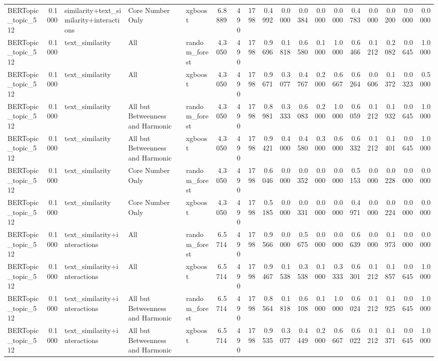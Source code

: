 \begin{tabular}{lrlllrrrrrrrrrrrrr}
BERTopic_topic_512 & 0.1000 & similarity+text_similarity+interactions & Core Number Only & xgboost & 6.8889 & 490 & 1798 & 0.4992 & 0.0000 & 0.0384 & 0.0000 & 0.0000 & 0.4783 & 0.0000 & 0.0200 & 0.0000 & 0.0000 \\
BERTopic_topic_512 & 0.1000 & text_similarity & All & random_forest & 4.3050 & 490 & 1798 & 0.9696 & 0.1818 & 0.6580 & 0.1000 & 1.0000 & 0.6466 & 0.1212 & 0.2082 & 0.0645 & 1.0000 \\
BERTopic_topic_512 & 0.1000 & text_similarity & All & xgboost & 4.3050 & 490 & 1798 & 0.9671 & 0.3077 & 0.4767 & 0.2000 & 0.6667 & 0.6264 & 0.0606 & 0.1372 & 0.0323 & 0.5000 \\
BERTopic_topic_512 & 0.1000 & text_similarity & All but Betweenness and Harmonic & random_forest & 4.3050 & 490 & 1798 & 0.8981 & 0.3333 & 0.6083 & 0.2000 & 1.0000 & 0.6059 & 0.1212 & 0.1932 & 0.0645 & 1.0000 \\
BERTopic_topic_512 & 0.1000 & text_similarity & All but Betweenness and Harmonic & xgboost & 4.3050 & 490 & 1798 & 0.9421 & 0.4000 & 0.4580 & 0.3000 & 0.6000 & 0.6332 & 0.1212 & 0.1401 & 0.0645 & 1.0000 \\
BERTopic_topic_512 & 0.1000 & text_similarity & Core Number Only & random_forest & 4.3050 & 490 & 1798 & 0.6046 & 0.0000 & 0.0352 & 0.0000 & 0.0000 & 0.5153 & 0.0000 & 0.0228 & 0.0000 & 0.0000 \\
BERTopic_topic_512 & 0.1000 & text_similarity & Core Number Only & xgboost & 4.3050 & 490 & 1798 & 0.5185 & 0.0000 & 0.0331 & 0.0000 & 0.0000 & 0.4971 & 0.0000 & 0.0224 & 0.0000 & 0.0000 \\
BERTopic_topic_512 & 0.1000 & text_similarity+interactions & All & random_forest & 6.5714 & 490 & 1798 & 0.9566 & 0.0000 & 0.5675 & 0.0000 & 0.0000 & 0.6639 & 0.0000 & 0.1973 & 0.0000 & 0.0000 \\
BERTopic_topic_512 & 0.1000 & text_similarity+interactions & All & xgboost & 6.5714 & 490 & 1798 & 0.9467 & 0.1538 & 0.3538 & 0.1000 & 0.3333 & 0.6301 & 0.1212 & 0.1857 & 0.0645 & 1.0000 \\
BERTopic_topic_512 & 0.1000 & text_similarity+interactions & All but Betweenness and Harmonic & random_forest & 6.5714 & 490 & 1798 & 0.8564 & 0.1818 & 0.6108 & 0.1000 & 1.0000 & 0.6024 & 0.1212 & 0.1925 & 0.0645 & 1.0000 \\
BERTopic_topic_512 & 0.1000 & text_similarity+interactions & All but Betweenness and Harmonic & xgboost & 6.5714 & 490 & 1798 & 0.9535 & 0.3077 & 0.4449 & 0.2000 & 0.6667 & 0.6022 & 0.1212 & 0.1371 & 0.0645 & 1.0000 \\

\end{tabular}

